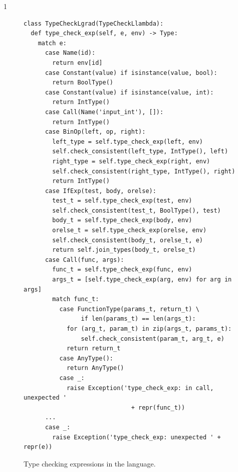 \documentclass[7x10]{TimesAPriori_MIT}%
\def\pythonEd{1}
\providecommand{\BookEdition}{1}
\let\edition\BookEdition
\newcommand{\pythonColor}[0]{}
\numberwithin{theorem}{chapter}
\numberwithin{definition}{chapter}
\numberwithin{equation}{chapter}
\begin{document}
{\if\edition\pythonEd\pythonColor        
\begin{figure}[tbp]
\begin{tcolorbox}[colback=white]  
\begin{lstlisting}
class TypeCheckLgrad(TypeCheckLlambda):
  def type_check_exp(self, e, env) -> Type:
    match e:
      case Name(id):
        return env[id]
      case Constant(value) if isinstance(value, bool):
        return BoolType()
      case Constant(value) if isinstance(value, int):
        return IntType()
      case Call(Name('input_int'), []):
        return IntType()
      case BinOp(left, op, right):
        left_type = self.type_check_exp(left, env)
        self.check_consistent(left_type, IntType(), left)
        right_type = self.type_check_exp(right, env)
        self.check_consistent(right_type, IntType(), right)
        return IntType()
      case IfExp(test, body, orelse):
        test_t = self.type_check_exp(test, env)
        self.check_consistent(test_t, BoolType(), test)
        body_t = self.type_check_exp(body, env)
        orelse_t = self.type_check_exp(orelse, env)
        self.check_consistent(body_t, orelse_t, e)
        return self.join_types(body_t, orelse_t)
      case Call(func, args):
        func_t = self.type_check_exp(func, env)
        args_t = [self.type_check_exp(arg, env) for arg in args]
        match func_t:
          case FunctionType(params_t, return_t) \
                if len(params_t) == len(args_t):
            for (arg_t, param_t) in zip(args_t, params_t):
                self.check_consistent(param_t, arg_t, e)
            return return_t
          case AnyType():
            return AnyType()
          case _:
            raise Exception('type_check_exp: in call, unexpected '
                              + repr(func_t))
      ...
      case _:
        raise Exception('type_check_exp: unexpected ' + repr(e))
\end{lstlisting}
\end{tcolorbox}

\caption{Type checking expressions in the \LangGrad{} language.}
\label{fig:type-check-Lgradual-1}
\end{figure}

}
\end{document}

